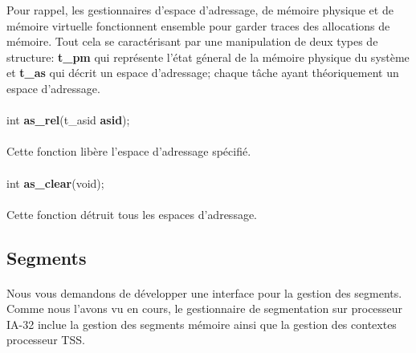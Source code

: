 \documentclass[10pt,a4wide]{article}
\begin{document}
Pour rappel, les gestionnaires d'espace d'adressage, de m\'emoire physique
et de m\'emoire virtuelle fonctionnent ensemble pour garder traces des
allocations de m\'emoire. Tout cela se caract\'erisant par une manipulation
de deux types de structure: \textbf{t\_pm} qui repr\'esente l'\'etat g\'eneral
de la m\'emoire physique du syst\`eme et \textbf{t\_as} qui d\'ecrit
un espace d'adressage; chaque t\^ache ayant th\'eoriquement un espace
d'adressage.

\paragraph{}

\hspace{1.5cm}int \textbf{as\_rel}(t\_asid \textbf{asid});

\paragraph{}

Cette fonction lib\`ere l'espace d'adressage sp\'ecifi\'e.

\paragraph{}

\hspace{1.5cm}int \textbf{as\_clear}(void);

\paragraph{}

Cette fonction d\'etruit tous les espaces d'adressage.

\subsection{Segments}

\paragraph{}

Nous vous demandons de d\'evelopper une interface pour la gestion des
segments. Comme nous l'avons vu en cours, le gestionnaire
de segmentation sur processeur IA-32 inclue la gestion des segments
m\'emoire ainsi que la gestion des contextes processeur TSS.

\paragraph{}
\end{document}
